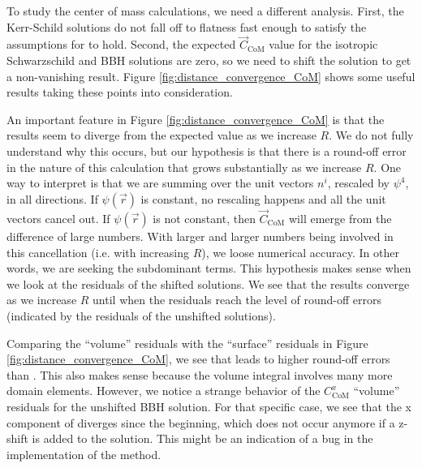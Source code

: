 \documentclass{../document}
\begin{document}
      To study the center of mass calculations, we need a different analysis. First, the Kerr-Schild solutions do not fall off to flatness fast enough to satisfy the assumptions for \eq{\eqref{eq:CoM-surf}} to hold. Second, the expected $\vec C_\text{CoM}$ value for the isotropic Schwarzschild and BBH solutions are zero, so we need to shift the solution to get a non-vanishing result. Figure \ref{fig:distance_convergence_CoM} shows some useful results taking these points into consideration.
      
      An important feature in Figure \ref{fig:distance_convergence_CoM} is that the results seem to diverge from the expected value as we increase $R$. We do not fully understand why this occurs, but our hypothesis is that there is a round-off error in the nature of this calculation that grows substantially as we increase $R$. One way to interpret \eq{\eqref{eq:CoM-surf}} is that we are summing over the unit vectors $n^i$, rescaled by $\psi^4$, in all directions. If $\psi(\vec r)$ is constant, no rescaling happens and all the unit vectors cancel out. If $\psi(\vec r)$ is not constant, then $\vec C_\text{CoM}$ will emerge from the difference of large numbers. With larger and larger numbers being involved in this cancellation (i.e. with increasing $R$), we loose numerical accuracy. In other words, we are seeking the subdominant terms. This hypothesis makes sense when we look at the residuals of the shifted solutions. We see that the results converge as we increase $R$ until when the residuals reach the level of round-off errors (indicated by the residuals of the unshifted solutions).

      Comparing the ``volume'' residuals with the ``surface'' residuals in Figure \ref{fig:distance_convergence_CoM}, we see that \eq{\eqref{eq:CoM-mixed}} leads to higher round-off errors than \eq{\eqref{eq:CoM-surf}}. This also makes sense because the volume integral involves many more domain elements. However, we notice a strange behavior of the $C_\text{CoM}^x$ ``volume'' residuals for the unshifted BBH solution. For that specific case, we see that the x component of \eq{\eqref{eq:CoM-mixed}} diverges since the beginning, which does not occur anymore if a z-shift is added to the solution. This might be an indication of a bug in the implementation of the method.
\end{document}
